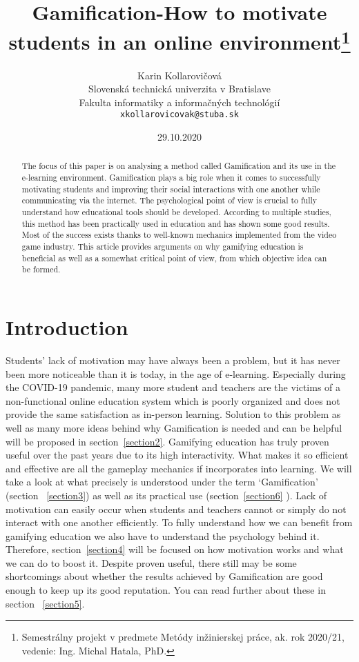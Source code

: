 \documentclass[10pt,twoside,english,a4paper]{article}
\title{Gamification-How to motivate students in an online environment\thanks{Semestrálny projekt v predmete Metódy inžinierskej práce, ak. rok 2020/21, vedenie: Ing. Michal Hatala, PhD.}}
\author{Karin Kollarovičová\\[2pt]
	{\small Slovenská technická univerzita v Bratislave}\\
	{\small Fakulta informatiky a informačných technológií}\\
	{\small \texttt{xkollarovicovak@stuba.sk}}
	}
\date{\small 29.10.2020}
\begin{document}
\maketitle

\begin{abstract}
	The focus of this paper is on analysing a method called Gamification and its use in the e-learning environment. 
	Gamification plays a big role when it comes to successfully motivating students and improving their social interactions with one another while communicating via the internet. 
	The psychological point of view is crucial to fully understand how educational tools should be developed. 
	According to multiple studies, this method has been practically used in education and has shown some good results. 
	Most of the success exists thanks to well-known mechanics implemented from the video game industry. 
	This article provides arguments on why gamifying education is beneficial as well as a somewhat critical point of view, from which objective idea can be formed. 
\end{abstract}



\section{Introduction} \label{introduction}
	Students’ lack of motivation may have always been a problem, but it has never been more noticeable than it is today, in the age of e-learning. 
	Especially during the COVID-19 pandemic, many more student and teachers are the victims of a non-functional online education system which is poorly organized and does not provide the same satisfaction as in-person learning.
	Solution to this problem as well as many more ideas behind why Gamification is needed and can be helpful will be proposed in section~\ref{section2}. 
	Gamifying education has truly proven useful over the past years due to its high interactivity. What makes it so efficient and effective are all the gameplay mechanics if incorporates into learning.
	We will take a look at what precisely is understood under the term ‘Gamification’ (section ~\ref{section3}) as well as its practical use (section~\ref{section6} ).
	Lack of motivation can easily occur when students and teachers cannot or simply do not interact with one another efficiently. To fully understand how we can benefit from gamifying education we also have to understand the psychology behind it.
	Therefore, section~\ref{section4} will be focused on how motivation works and what we can do to boost it. Despite proven useful, there still may be some shortcomings about whether the results achieved by Gamification are good enough to keep up its good reputation. You can read further about these in section ~\ref{section5}.
\end{document}
